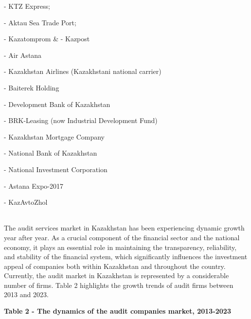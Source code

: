 \begin{longtable}[]
- KTZ Express;

- Aktau Sea Trade Port;

- Kazatomprom & - Kazpost

- Air Astana

- Kazakhstan Airlines (Kazakhstani national carrier)

- Baiterek Holding

- Development Bank of Kazakhstan

- BRK-Leasing (now Industrial Development Fund)

- Kazakhstan Mortgage Company

- National Bank of Kazakhstan

- National Investment Corporation

- Astana Expo-2017

- KazAvtoZhol \\
 \\
\end{longtable}

The audit services market in Kazakhstan has been experiencing dynamic
growth year after year. As a crucial component of the financial sector
and the national economy, it plays an essential role in maintaining the
transparency, reliability, and stability of the financial system, which
significantly influences the investment appeal of companies both within
Kazakhstan and throughout the country. Currently, the audit market in
Kazakhstan is represented by a considerable number of firms. Table 2
highlights the growth trends of audit firms between 2013 and 2023.

\textbf{Table 2 - The dynamics of the audit companies market, 2013-2023}

